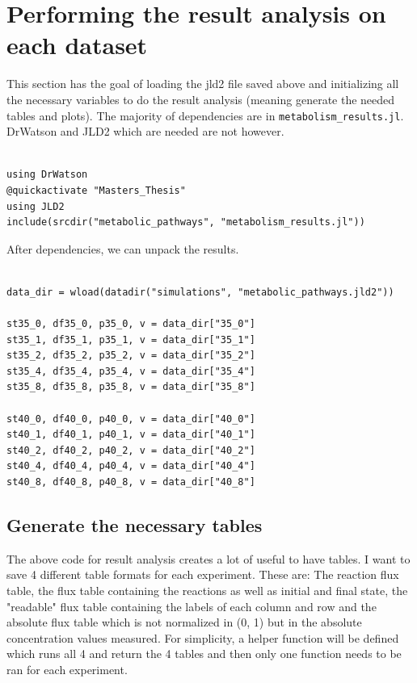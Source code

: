 \documentclass[11pt]{article}
\begin{document}
\section{Performing the result analysis on each dataset}
\label{sec:org28e635e}
This section has the goal of loading the jld2 file saved above and initializing all the necessary variables to do the result analysis (meaning generate the needed tables and plots). The majority of dependencies are in \texttt{metabolism\_results.jl}. DrWatson and JLD2 which are needed are not however.

\begin{verbatim}

using DrWatson
@quickactivate "Masters_Thesis"
using JLD2
include(srcdir("metabolic_pathways", "metabolism_results.jl"))
\end{verbatim}

After dependencies, we can unpack the results.

\begin{verbatim}

data_dir = wload(datadir("simulations", "metabolic_pathways.jld2"))

st35_0, df35_0, p35_0, v = data_dir["35_0"]
st35_1, df35_1, p35_1, v = data_dir["35_1"]
st35_2, df35_2, p35_2, v = data_dir["35_2"]
st35_4, df35_4, p35_4, v = data_dir["35_4"]
st35_8, df35_8, p35_8, v = data_dir["35_8"]

st40_0, df40_0, p40_0, v = data_dir["40_0"]
st40_1, df40_1, p40_1, v = data_dir["40_1"]
st40_2, df40_2, p40_2, v = data_dir["40_2"]
st40_4, df40_4, p40_4, v = data_dir["40_4"]
st40_8, df40_8, p40_8, v = data_dir["40_8"]
\end{verbatim}

\subsection{Generate the necessary tables}
\label{sec:orgd824732}
The above code for result analysis creates a lot of useful to have tables. I want to save 4 different table formats for each experiment. These are: The reaction flux table, the flux table containing the reactions as well as initial and final state, the "readable" flux table containing the labels of each column and row and the absolute flux table which is not normalized in (0, 1) but in the absolute concentration values measured. For simplicity, a helper function will be defined which runs all 4 and return the 4 tables and then only one function needs to be ran for each experiment.
\end{document}

